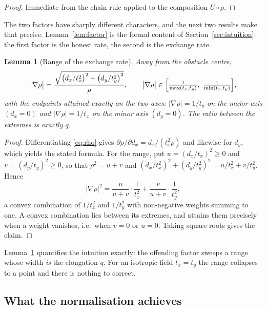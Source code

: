 \documentclass[11pt]{article}
\newtheorem{lemma}[theorem]{Lemma}
\theoremstyle{remark}
\begin{document}
\begin{proof}
Immediate from the chain rule applied to the composition $U\circ\rho$.
\end{proof}

The two factors have sharply different characters, and the next two results
make that precise. Lemma~\ref{lem:factor} is the formal content of
Section~\ref{sec:intuition}: the first factor is the honest rate, the second
is the exchange rate.

\begin{lemma}[Range of the exchange rate]
\label{lem:range}
Away from the obstacle centre,
\begin{equation}
  \bigl|\nabla\rho\bigr|
  =\frac{\sqrt{\bigl(d_{x}/t_{x}^{2}\bigr)^{2}+\bigl(d_{y}/t_{y}^{2}\bigr)^{2}}}{\rho},
  \qquad
  \bigl|\nabla\rho\bigr|\in
  \Bigl[\tfrac{1}{\max(t_{x},t_{y})},\ \tfrac{1}{\min(t_{x},t_{y})}\Bigr],
\end{equation}
with the endpoints attained exactly on the two axes: $|\nabla\rho|=1/t_{y}$
on the major axis $(d_{x}=0)$ and $|\nabla\rho|=1/t_{x}$ on the minor axis
$(d_{y}=0)$. The ratio between the extremes is exactly $q$.
\end{lemma}

\begin{proof}
Differentiating \eqref{eq:rho} gives
$\partial\rho/\partial d_{x}=d_{x}/(t_{x}^{2}\rho)$ and likewise for
$d_{y}$, which yields the stated formula. For the range, put
$u=(d_{x}/t_{x})^{2}\ge0$ and $v=(d_{y}/t_{y})^{2}\ge0$, so that
$\rho^{2}=u+v$ and
$(d_{x}/t_{x}^{2})^{2}+(d_{y}/t_{y}^{2})^{2}=u/t_{x}^{2}+v/t_{y}^{2}$.
Hence
\begin{equation}
  \bigl|\nabla\rho\bigr|^{2}
  =\frac{u}{u+v}\cdot\frac{1}{t_{x}^{2}}
  +\frac{v}{u+v}\cdot\frac{1}{t_{y}^{2}},
\end{equation}
a convex combination of $1/t_{x}^{2}$ and $1/t_{y}^{2}$ with non-negative
weights summing to one. A convex combination lies between its extremes, and
attains them precisely when a weight vanishes, i.e.\ when $v=0$ or $u=0$.
Taking square roots gives the claim.
\end{proof}

\noindent
Lemma~\ref{lem:range} quantifies the intuition exactly: the offending factor
sweeps a range whose width \emph{is} the elongation $q$. For an isotropic
field $t_{x}=t_{y}$ the range collapses to a point and there is nothing to
correct.

\subsection{What the normalisation achieves}
\end{document}
